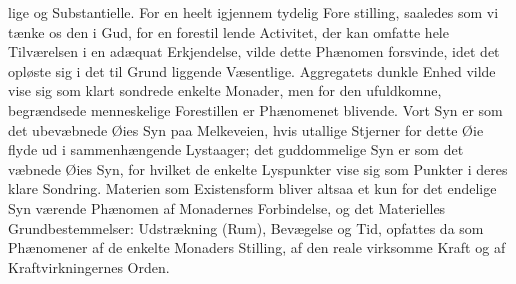 \documentclass[12pt,a4paper]{book}
\begin{document}
lige og Substantielle. For en heelt igjennem tydelig Fore\-%
stilling, saaledes som vi tænke os den i Gud, for en forestil\-%
lende Activitet, der kan omfatte hele Tilværelsen i en adæquat
Erkjendelse, vilde dette Phænomen forsvinde, idet det opløste
sig i det til Grund liggende Væsentlige. Aggregatets dunkle
Enhed vilde vise sig som klart sondrede enkelte Monader, men
for den ufuldkomne, begrændsede menneskelige Forestillen er
Phænomenet blivende. Vort Syn er som det ubevæbnede Øies
Syn paa Melkeveien, hvis utallige Stjerner for dette Øie flyde
ud i sammenhængende Lystaager; det guddommelige Syn er
som det væbnede Øies Syn, for hvilket de enkelte Lyspunkter
vise sig som Punkter i deres klare Sondring. Materien som
Existensform bliver altsaa et kun for det endelige Syn værende
Phænomen af Monadernes Forbindelse, og det Materielles
Grundbestemmelser: Udstrækning (Rum), Bevægelse og Tid,
opfattes da som Phænomener af de enkelte Monaders Stilling,
af den reale virksomme Kraft og af Kraftvirkningernes Orden.
\end{document}
